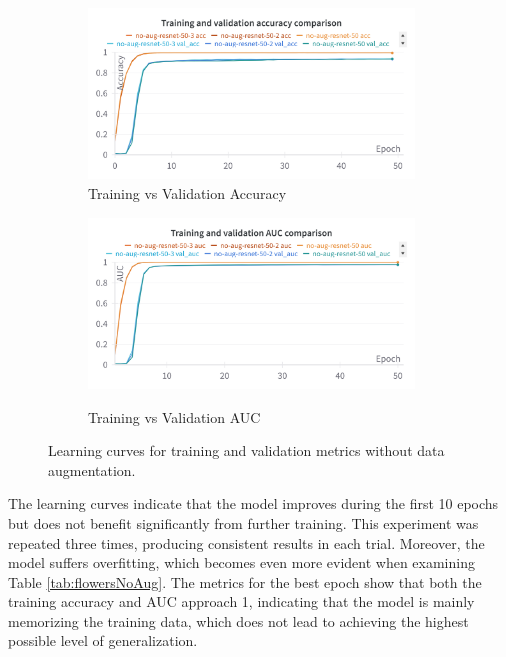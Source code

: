 \begin{figure}[!htb]
    \centering
    \begin{subfigure}{\textwidth}
        \includegraphics[width=0.95\textwidth]{Images/flowers-results/Flowers-no-aug-acc.png}
        \caption{Training vs Validation Accuracy}
    \end{subfigure}
    \vspace{0.3cm}
    
    \begin{subfigure}{\textwidth}
        \includegraphics[width=0.95\textwidth]{Images/flowers-results/Flowers-no-aug-auc.png}\
        \caption{Training vs Validation AUC}
    \end{subfigure}
    \vspace{0.3cm}

    \caption{Learning curves for training and validation metrics without data augmentation.}
    \label{fig:flowersNoAug}
\end{figure}

The learning curves indicate that the model improves during the first 10 epochs but does not benefit significantly from further training. This experiment was repeated three times, producing consistent results in each trial.  Moreover, the model suffers overfitting, which becomes even more evident when examining Table \ref{tab:flowersNoAug}. The metrics for the best epoch show that both the training accuracy and AUC approach 1, indicating that the model is mainly memorizing the training data, which does not lead to achieving the highest possible level of generalization.

